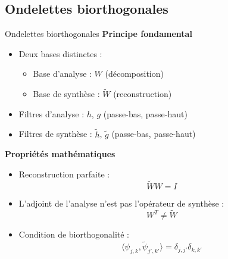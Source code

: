 \subsection{Ondelettes biorthogonales}
\begin{frame}{Ondelettes biorthogonales}
    \textbf{Principe fondamental}
    \begin{itemize}
        \item Deux bases distinctes :
        \begin{itemize}
            \item Base d'analyse : $W$ (décomposition)
            \item Base de synthèse : $\tilde{W}$ (reconstruction)
        \end{itemize}
        \item Filtres d'analyse : $h$, $g$ (passe-bas, passe-haut)
        \item Filtres de synthèse : $\tilde{h}$, $\tilde{g}$ (passe-bas, passe-haut)
    \end{itemize}

    \vspace{0.2cm}

    \textbf{Propriétés mathématiques}
    \begin{itemize}
        \item Reconstruction parfaite :
        \[
        \tilde{W} W = I
        \]
        \item L'adjoint de l'analyse n'est pas l'opérateur de synthèse :
        \[
        W^T \neq \tilde{W}
        \]
        \item Condition de biorthogonalité :
        \[
        \langle \psi_{j,k}, \tilde{\psi}_{j',k'} \rangle = \delta_{j,j'} \delta_{k,k'}
        \]
    \end{itemize}




\end{frame}
